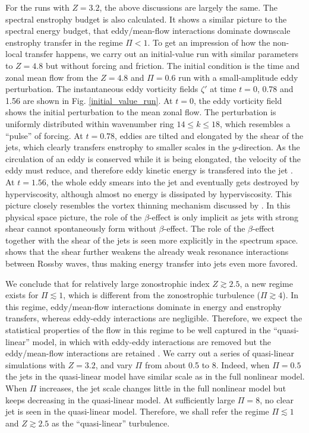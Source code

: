 \documentclass{ametsoc}
\begin{document}
For the runs with $Z=3.2$, the above discussions are largely the
same. The spectral enstrophy budget is also calculated. It shows a
similar picture to the spectral energy budget, that eddy/mean-flow
interactions dominate downscale enstrophy transfer in the regime $\Pi<1$.
To get an impression of how the non-local transfer happens, we carry
out an initial-value run with similar parameters to $Z=4.8$ but without
forcing and friction. The initial condition is the time and zonal mean
flow from the $Z=4.8$ and $\Pi=0.6$ run with a small-amplitude eddy
perturbation. The instantaneous eddy vorticity fields $\zeta'$ at
time $t=0$, 0.78 and 1.56 are shown in Fig. \ref{initial_value_run}.
At $t=0$, the eddy vorticity field shows the initial perturbation to the
mean zonal flow. The perturbation is uniformly distributed within
wavenumber ring $14\leq k\leq18$, which resembles a ``pulse'' of
forcing. At $t=0.78$, eddies are tilted and elongated by the shear
of the jets, which clearly transfers enstrophy to smaller scales in the
$y$-direction. As the circulation of an eddy is conserved while it
is being elongated, the velocity of the eddy must reduce, and therefore
eddy kinetic energy is transfered into the jet \citep{Kraichnan1976}.
At $t=1.56$, the whole eddy smears into the jet and eventually
gets destroyed by hyperviscosity, although almost no energy is dissipated
by hyperviscosity. This picture closely resembles the vortex thinning
mechanism discussed by \citet{Manz2009}. In this physical space picture,
the role of the $\beta$-effect is only implicit as jets with strong shear
cannot spontaneously form without $\beta$-effect. The role of the $\beta$-effect
together with the shear of the jets is seen more explicitly in the
spectrum space. \citet{Gurcan2012} shows that the shear further weakens
the already weak resonance interactions between Rossby waves, thus
making energy transfer into jets even more favored.

We conclude that for relatively large zonostrophic index $Z\apprge2.5$,
a new regime exists for $\Pi\apprle1$, which is different from the
zonostrophic turbulence ($\Pi\apprge4$). In this regime, eddy/mean-flow
interactions dominate in energy and enstrophy transfers, whereas eddy-eddy
interactions are negligible. Therefore, we expect the statistical
properties of the flow in this regime to be well captured in the ``quasi-linear''
model, in which with eddy-eddy interactions are removed but the eddy/mean-flow
interactions are retained \citep{O'Gorman2007,Tobias2013}. We carry
out a series of quasi-linear simulations with $Z=3.2$, and vary $\Pi$
from about 0.5 to 8. Indeed, when $\Pi=0.5$ the jets in the
quasi-linear model have similar scale as in the full nonlinear
model. When $\Pi$ increases, the jet scale changes little in the
full nonlinear model but keeps decreasing in the quasi-linear model.
At sufficiently large $\Pi=8$, no clear jet is seen in the quasi-linear
model. Therefore, we shall refer the regime $\Pi\apprle1$ and $Z\apprge2.5$
as the ``quasi-linear'' turbulence.
\end{document}

